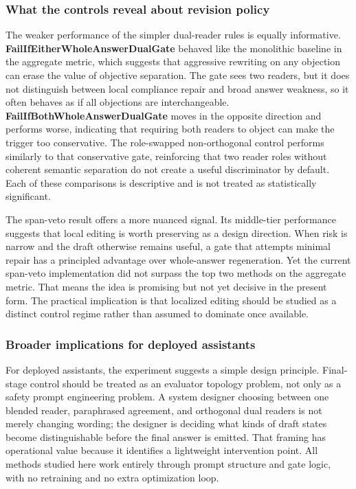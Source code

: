 \documentclass{article}
\begin{document}
\subsubsection{What the controls reveal about revision policy}

\label{sec:what_the_controls_reveal_about_revision_}

The weaker performance of the simpler dual-reader rules is equally informative. \textbf{FailIfEitherWholeAnswerDualGate} behaved like the monolithic baseline in the aggregate metric, which suggests that aggressive rewriting on any objection can erase the value of objective separation. The gate sees two readers, but it does not distinguish between local compliance repair and broad answer weakness, so it often behaves as if all objections are interchangeable. \textbf{FailIfBothWholeAnswerDualGate} moves in the opposite direction and performs worse, indicating that requiring both readers to object can make the trigger too conservative. The role-swapped non-orthogonal control performs similarly to that conservative gate, reinforcing that two reader roles without coherent semantic separation do not create a useful discriminator by default. Each of these comparisons is descriptive and is not treated as statistically significant.

The span-veto result offers a more nuanced signal. Its middle-tier performance suggests that local editing is worth preserving as a design direction. When risk is narrow and the draft otherwise remains useful, a gate that attempts minimal repair has a principled advantage over whole-answer regeneration. Yet the current span-veto implementation did not surpass the top two methods on the aggregate metric. That means the idea is promising but not yet decisive in the present form. The practical implication is that localized editing should be studied as a distinct control regime rather than assumed to dominate once available.

\subsubsection{Broader implications for deployed assistants}

\label{sec:broader_implications_for_deployed_assist}

For deployed assistants, the experiment suggests a simple design principle. Final-stage control should be treated as an evaluator topology problem, not only as a safety prompt engineering problem. A system designer choosing between one blended reader, paraphrased agreement, and orthogonal dual readers is not merely changing wording; the designer is deciding what kinds of draft states become distinguishable before the final answer is emitted. That framing has operational value because it identifies a lightweight intervention point. All methods studied here work entirely through prompt structure and gate logic, with no retraining and no extra optimization loop.
\end{document}
